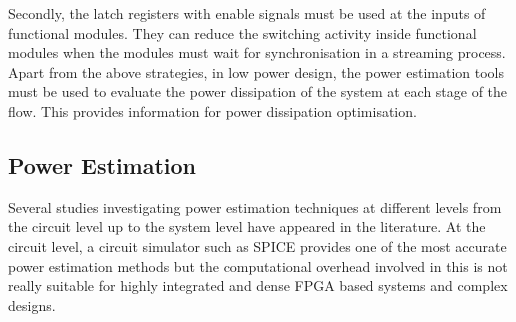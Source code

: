 Secondly, the latch registers with enable signals must be used at the inputs of functional modules.
They can reduce the switching activity inside functional modules when the modules must wait for synchronisation in a streaming process.
Apart from the above strategies, in low power design, the power estimation tools must be used to evaluate the power dissipation of the system at each stage of the flow. 
This provides information for power dissipation optimisation. 

\subsection{Power Estimation}

Several studies investigating power estimation techniques at different levels from the circuit level up to the system level have appeared in the literature.
At the circuit level, a circuit simulator such as SPICE \cite{Deng1994} provides one of the most accurate power estimation methods but the computational overhead involved in this is not really suitable for highly integrated and dense FPGA based systems and complex designs. 

%

